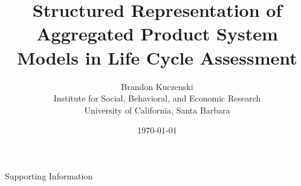 \documentclass[12pt]{article}
\title{Structured Representation of Aggregated Product System Models in Life Cycle Assessment}
\author{Brandon Kuczenski\\
Institute for Social, Behavioral, and Economic Research\\
University of California, Santa Barbara}
\date{\mydate\today}
\def\mainpaper{

  \maketitle

  

  \doublespacing

  {\red http://pubs.acs.org/doi/pdf/10.1021/acs.est.5b01558}

  
  
  
  
  
  
  

  

  
  
  
  
  

  

  \singlespacing
  
}
\def\supporting{
  \renewcommand{\thefigure}{S\arabic{figure}}
  \renewcommand{\thetable}{S\arabic{table}}

  \maketitle

  \begin{center}
    \Large Supporting Information
  \end{center}

  \doublespacing

  

  
  
  
  
  

  \singlespacing
}
\def\unused{
  
}
\begin{document}
\supporting

\end{document}
